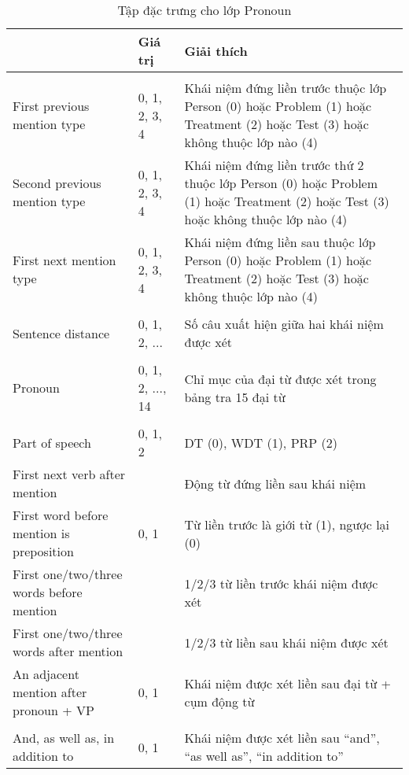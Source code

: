 \begin{table}[t!]
\centering{}
\caption{Tập đặc trưng cho lớp Pronoun \label{tab:PronounFeatures}}
\footnotesize\sffamily

\begin{tabularx}{\textwidth}{@{\hspace{1em}}P{\raggedright}{0.3}lL@{}}
\toprule 
{} & \textbf{Giá trị} & \textbf{Giải thích}\\
\midrule
{}\\
First previous mention type & 0, 1, 2, 3, 4 & Khái niệm đứng liền trước thuộc lớp Person (0) hoặc Problem (1) hoặc Treatment (2) hoặc Test (3) hoặc không thuộc lớp nào (4)\\
Second previous mention type & 0, 1, 2, 3, 4 & Khái niệm đứng liền trước thứ 2 thuộc lớp Person (0) hoặc Problem (1) hoặc Treatment (2) hoặc Test (3) hoặc không thuộc lớp nào (4)\\
First next mention type & 0, 1, 2, 3, 4 & Khái niệm đứng liền sau thuộc lớp Person (0) hoặc Problem (1) hoặc Treatment (2) hoặc Test (3) hoặc không thuộc lớp nào (4)\\
\\
Sentence distance & 0, 1, 2, ... & Số câu xuất hiện giữa hai khái niệm được xét\\
\\
Pronoun & 0, 1, 2, ..., 14 & Chỉ mục của đại từ được xét trong bảng tra 15 đại từ\\
\\
Part of speech & 0, 1, 2 & DT (0), WDT (1), PRP (2)\\
First next verb after mention & & Động từ đứng liền sau khái niệm\\
First word before mention is preposition & 0, 1 & Từ liền trước là giới từ (1), ngược lại (0)\\
First one/two/three words before mention & & 1/2/3 từ liền trước khái niệm được xét\\
First one/two/three words after mention & & 1/2/3 từ liền sau khái niệm được xét\\
An adjacent mention after pronoun + VP  & 0, 1 & Khái niệm được xét liền sau đại từ + cụm động từ\\
\\
And, as well as, in addition to & 0, 1 & Khái niệm được xét liền sau ``and'', ``as well as'', ``in addition to''\\
\bottomrule
\end{tabularx}
\end{table}

